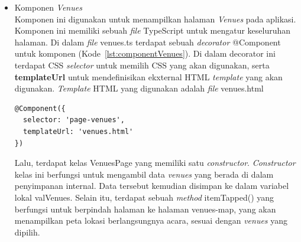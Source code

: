 \begin{itemize}
\begin{itemize}
\begin{lstlisting}[language=html, label={lst:contentSchedule}, caption=\textit{Content} pada schedule.html]
<ion-content>
  <div id="schedulesContainer">
    <div id="schedulesSegments">
      <ion-segment #segmentContainer *ngIf="schedules" [(ngModel)]="selectedSegmentIdx" (ionChange)="onSegmentChanged($event)">
        <ion-segment-button *ngFor="let schedule of schedules; let i = index" [value]="i">
          <div class="day">{{getDayName(schedule.date)}}</div>
          <div class="date">{{getDate(schedule.date)}}</div>
        </ion-segment-button>
      </ion-segment>
    </div>
    <div id="schedulesSlides">
      <ion-slides #scheduleSlider (ionSlideDidChange)="onSlideChanged()">
        <ion-slide *ngFor="let schedule of schedules">
          <ion-list>
            <ion-item text-wrap *ngFor="let agenda of schedule.agenda">
              <ion-note item-start>
                {{agenda.start}}<br/>
                {{agenda.end}}
              </ion-note>
              <h3>{{agenda.title}}</h3>
              <p>{{agenda.subtitle}}</p>
            </ion-item>
          </ion-list>
        </ion-slide>
      </ion-slides>
    </div>
  </div>
</ion-content>
\end{lstlisting} 
		
	\end{itemize}

	\item Komponen \textit{Venues} \\
	Komponen ini digunakan untuk menampilkan halaman \textit{Venues} pada aplikasi. Komponen ini memiliki sebuah \textit{file} TypeScript untuk mengatur keseluruhan halaman. Di dalam \textit{file} venues.ts terdapat sebuah \textit{decorator} @Component untuk komponen (Kode~\ref{lst:componentVenues}). Di dalam decorator ini terdapat CSS \textit{selector} untuk memilih CSS yang akan digunakan, serta \textbf{templateUrl} untuk mendefinisikan ekxternal HTML \textit{template} yang akan digunakan. \textit{Template} HTML yang digunakan adalah \textit{file} venues.html
	
\begin{lstlisting}[language=html, label={lst:componentVenues}, caption=@Component pada venues.ts]
@Component({
  selector: 'page-venues',
  templateUrl: 'venues.html'
})
\end{lstlisting}

	Lalu, terdapat kelas VenuesPage yang memiliki satu \textit{constructor}. \textit{Constructor} kelas ini berfungsi untuk mengambil data \textit{venues} yang berada di dalam penyimpanan internal. Data tersebut kemudian disimpan ke dalam variabel lokal valVenues. Selain itu, terdapat sebuah \textit{method} itemTapped() yang berfungsi untuk berpindah halaman ke halaman venues-map, yang akan menampilkan peta lokasi berlangsungnya acara, sesuai dengan \textit{venues} yang dipilih.


\end{itemize}
